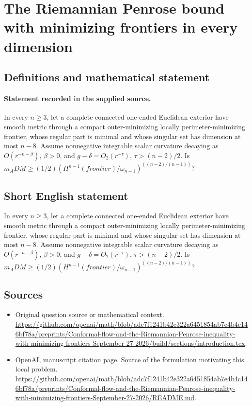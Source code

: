 \documentclass[11pt]{article}
\begin{document}
\section*{The Riemannian Penrose bound with minimizing frontiers in every dimension}\label{statement}
\subsection{Definitions and mathematical statement}
\paragraph{Statement recorded in the supplied source.}
In every $n\geq 3$, let a complete connected one-ended Euclidean exterior have smooth metric through a compact outer-minimizing locally perimeter-minimizing frontier, whose regular part is minimal and whose singular set has dimension at most $n-8$. Assume nonnegative integrable scalar curvature decaying as $O(r^{-n-\beta })$, $\beta >0$, and $g-\delta =O_2(r^{-\tau })$, $\tau >(n-2)/2$. Is $m_ADM\geq (1/2)(H^{n-1}(frontier)/\omega _{n-1})^((n-2)/(n-1))$?
\subsection{Short English statement}
In every $n\geq 3$, let a complete connected one-ended Euclidean exterior have smooth metric through a compact outer-minimizing locally perimeter-minimizing frontier, whose regular part is minimal and whose singular set has dimension at most $n-8$. Assume nonnegative integrable scalar curvature decaying as $O(r^{-n-\beta })$, $\beta >0$, and $g-\delta =O_2(r^{-\tau })$, $\tau >(n-2)/2$. Is $m_ADM\geq (1/2)(H^{n-1}(frontier)/\omega _{n-1})^((n-2)/(n-1))$?
\subsection{Sources}
\begin{itemize}
\item[S1] Original question source or mathematical context.
\url{https://github.com/openai/math/blob/adc7f1241b42e322a6451854ab7e4b4c146bf78a/preprints/Conformal-flow-and-the-Riemannian-Penrose-inequality-with-minimizing-frontiers-September-27-2026/build/sections/introduction.tex}.
\item[S2] OpenAI, manuscript citation page. Source of the formulation motivating this local problem.
\url{https://github.com/openai/math/blob/adc7f1241b42e322a6451854ab7e4b4c146bf78a/preprints/Conformal-flow-and-the-Riemannian-Penrose-inequality-with-minimizing-frontiers-September-27-2026/README.md}.
\end{itemize}
\end{document}
